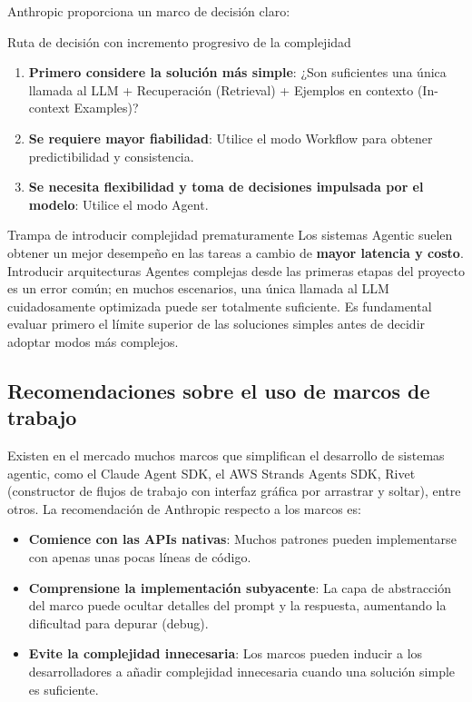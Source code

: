 Anthropic proporciona un marco de decisión claro:

\begin{knowledgebox}{Ruta de decisión con incremento progresivo de la complejidad}
\begin{enumerate}
    \item \textbf{Primero considere la solución más simple}: ¿Son suficientes una única llamada al LLM + Recuperación (Retrieval) + Ejemplos en contexto (In-context Examples)?
    \item \textbf{Se requiere mayor fiabilidad}: Utilice el modo Workflow para obtener predictibilidad y consistencia.
    \item \textbf{Se necesita flexibilidad y toma de decisiones impulsada por el modelo}: Utilice el modo Agent.
\end{enumerate}
\end{knowledgebox}

\begin{warningbox}{Trampa de introducir complejidad prematuramente}
Los sistemas Agentic suelen obtener un mejor desempeño en las tareas a cambio de \textbf{mayor latencia y costo}. Introducir arquitecturas Agentes complejas desde las primeras etapas del proyecto es un error común; en muchos escenarios, una única llamada al LLM cuidadosamente optimizada puede ser totalmente suficiente. Es fundamental evaluar primero el límite superior de las soluciones simples antes de decidir adoptar modos más complejos.
\end{warningbox}

\subsection{Recomendaciones sobre el uso de marcos de trabajo}

Existen en el mercado muchos marcos que simplifican el desarrollo de sistemas agentic, como el Claude Agent SDK, el AWS Strands Agents SDK, Rivet (constructor de flujos de trabajo con interfaz gráfica por arrastrar y soltar), entre otros. La recomendación de Anthropic respecto a los marcos es:

\begin{itemize}
    \item \textbf{Comience con las APIs nativas}: Muchos patrones pueden implementarse con apenas unas pocas líneas de código.
    \item \textbf{Comprensione la implementación subyacente}: La capa de abstracción del marco puede ocultar detalles del prompt y la respuesta, aumentando la dificultad para depurar (debug).
    \item \textbf{Evite la complejidad innecesaria}: Los marcos pueden inducir a los desarrolladores a añadir complejidad innecesaria cuando una solución simple es suficiente.
\end{itemize}

